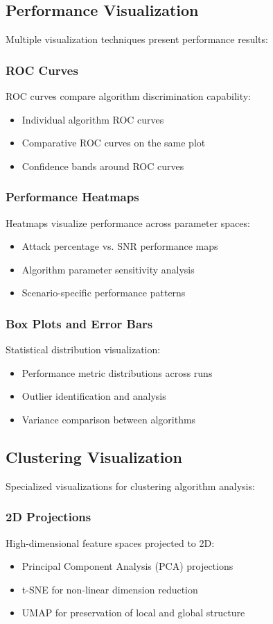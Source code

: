 \subsection{Performance Visualization}
Multiple visualization techniques present performance results:

\subsubsection{ROC Curves}
ROC curves compare algorithm discrimination capability:
\begin{itemize}
\item Individual algorithm ROC curves
\item Comparative ROC curves on the same plot
\item Confidence bands around ROC curves
\end{itemize}

\subsubsection{Performance Heatmaps}
Heatmaps visualize performance across parameter spaces:
\begin{itemize}
\item Attack percentage vs. SNR performance maps
\item Algorithm parameter sensitivity analysis
\item Scenario-specific performance patterns
\end{itemize}

\subsubsection{Box Plots and Error Bars}
Statistical distribution visualization:
\begin{itemize}
\item Performance metric distributions across runs
\item Outlier identification and analysis
\item Variance comparison between algorithms
\end{itemize}

\subsection{Clustering Visualization}
Specialized visualizations for clustering algorithm analysis:

\subsubsection{2D Projections}
High-dimensional feature spaces projected to 2D:
\begin{itemize}
\item Principal Component Analysis (PCA) projections
\item t-SNE for non-linear dimension reduction
\item UMAP for preservation of local and global structure
\end{itemize}

